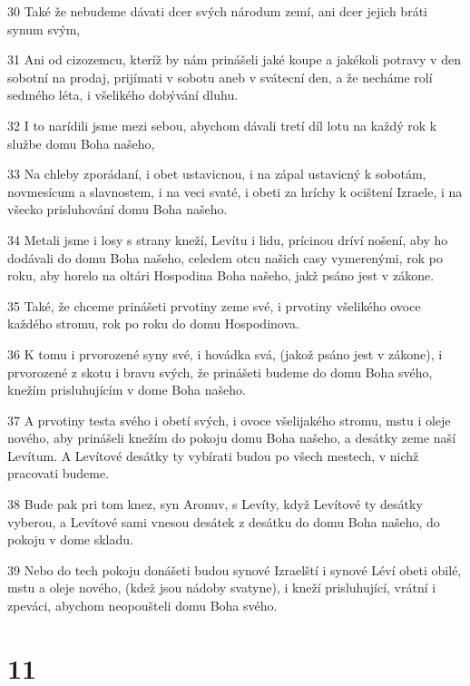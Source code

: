 \par 30 Také že nebudeme dávati dcer svých národum zemí, ani dcer jejich bráti synum svým,
\par 31 Ani od cizozemcu, kteríž by nám prinášeli jaké koupe a jakékoli potravy v den sobotní na prodaj, prijímati v sobotu aneb v svátecní den, a že necháme rolí sedmého léta, i všelikého dobývání dluhu.
\par 32 I to narídili jsme mezi sebou, abychom dávali tretí díl lotu na každý rok k službe domu Boha našeho,
\par 33 Na chleby zporádaní, i obet ustavicnou, i na zápal ustavicný k sobotám, novmesícum a slavnostem, i na veci svaté, i obeti za hríchy k ocištení Izraele, i na všecko prisluhování domu Boha našeho.
\par 34 Metali jsme i losy s strany kneží, Levítu i lidu, prícinou dríví nošení, aby ho dodávali do domu Boha našeho, celedem otcu našich casy vymerenými, rok po roku, aby horelo na oltári Hospodina Boha našeho, jakž psáno jest v zákone.
\par 35 Také, že chceme prinášeti prvotiny zeme své, i prvotiny všelikého ovoce každého stromu, rok po roku do domu Hospodinova.
\par 36 K tomu i prvorozené syny své, i hovádka svá, (jakož psáno jest v zákone), i prvorozené z skotu i bravu svých, že prinášeti budeme do domu Boha svého, knežím prisluhujícím v dome Boha našeho.
\par 37 A prvotiny testa svého i obetí svých, i ovoce všelijakého stromu, mstu i oleje nového, aby prinášeli knežím do pokoju domu Boha našeho, a desátky zeme naší Levítum. A Levítové desátky ty vybírati budou po všech mestech, v nichž pracovati budeme.
\par 38 Bude pak pri tom knez, syn Aronuv, s Levíty, když Levítové ty desátky vyberou, a Levítové sami vnesou desátek z desátku do domu Boha našeho, do pokoju v dome skladu.
\par 39 Nebo do tech pokoju donášeti budou synové Izraelští i synové Léví obeti obilé, mstu a oleje nového, (kdež jsou nádoby svatyne), i kneží prisluhující, vrátní i zpeváci, abychom neopoušteli domu Boha svého.

\chapter{11}

